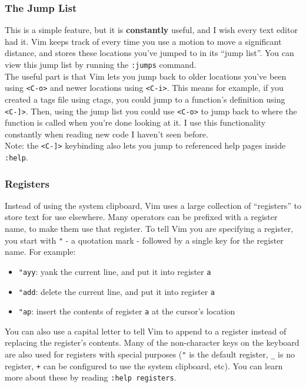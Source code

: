 \documentclass{beamer}
\begin{document}
\begin{frame}[fragile]
    \frametitle{The Jump List}
    \small
    This is a simple feature, but it is \textbf{constantly} useful, and I wish every text editor had it. Vim keeps track of every time you use a motion to move a significant distance, and stores these locations you've jumped to in its \enquote{jump list}. You can view this jump list by running the \verb+:jumps+ command.\\
    \vspace{0.5cm}
    The useful part is that Vim lets you jump back to older locations you've been using \verb+<C-o>+ and newer locations using \verb+<C-i>+. This means for example, if you created a tags file using ctags, you could jump to a function's definition using \verb+<C-]>+. Then, using the jump list you could use \verb+<C-o>+ to jump back to where the function is called when you're done looking at it. I use this functionality constantly when reading new code I haven't seen before.\\
    \vspace{0.5cm}
    Note: the \verb+<C-]>+ keybinding also lets you jump to referenced help pages inside \verb+:help+.
\end{frame}

\begin{frame}[fragile]
    \frametitle{Registers}
    \small
    Instead of using the system clipboard, Vim uses a large collection of \enquote{registers} to store text for use elsewhere. Many operators can be prefixed with a register name, to make them use that register. To tell Vim you are specifying a register, you start with \verb+"+ - a quotation mark - followed by a single key for the register name. For example:
    \begin{itemize}
	\item \verb+"ayy+: yank the current line, and put it into register \verb+a+
	\item \verb+"add+: delete the current line, and put it into register \verb+a+
	\item \verb+"ap+: insert the contents of register \verb+a+ at the cursor's location
    \end{itemize}
    You can also use a capital letter to tell Vim to append to a register instead of replacing the register's contents. Many of the non-character keys on the keyboard are also used for registers with special purposes (\verb+"+ is the default register, \verb+_+ is no register, \verb|+| can be configured to use the system clipboard, etc). You can learn more about these by reading \verb+:help registers+.
\end{frame}
\end{document}

